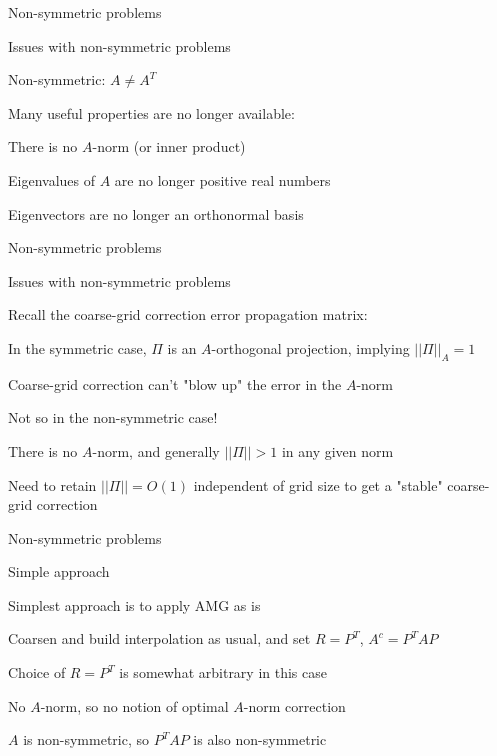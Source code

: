 \documentclass[18pt,xcolor=table]{beamer}
\begin{document}
\begin{frame}{Non-symmetric problems}
\begin{block}{Issues with non-symmetric problems}
\bit
\item Non-symmetric: $A\neq A^T$
\item Many useful properties are no longer available:
\bit
\item There is no $A$-norm (or inner product)
\item Eigenvalues of $A$ are no longer positive real numbers
\item Eigenvectors are no longer an orthonormal basis
\eit
\eit
\end{block}
\end{frame}

\begin{frame}{Non-symmetric problems}
\begin{block}{Issues with non-symmetric problems}
\bit
\item Recall the coarse-grid correction error propagation matrix:
\item In the symmetric case, $\Pi$ is an $A$-orthogonal projection, implying $||\Pi||_A=1$
\item Coarse-grid correction can't "blow up" the error in the $A$-norm
\item Not so in the non-symmetric case! 
\item There is no $A$-norm, and generally $||\Pi||>1$ in any given norm
\item Need to retain $||\Pi|| = O(1)$ independent of grid size to get a "stable" coarse-grid correction
\eit
\end{block}
\end{frame}

\begin{frame}{Non-symmetric problems}
\begin{block}{Simple approach}
\bit
\item Simplest approach is to apply AMG as is
\item Coarsen and build interpolation as usual, and set $R = P^T$, $A^c = P^TAP$
\item Choice of $R = P^T$ is somewhat arbitrary in this case
\bit
\item No $A$-norm, so no notion of optimal $A$-norm correction
\item $A$ is non-symmetric, so $P^TAP$ is also non-symmetric
\eit
\eit
\end{block}
\end{frame}
\end{document}
